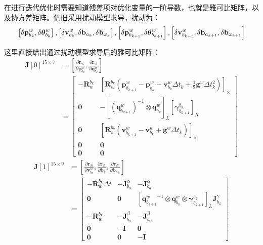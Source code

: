 在进行迭代优化时需要知道残差项对优化变量的一阶导数，也就是雅可比矩阵，以及协方差矩阵。仍旧采用扰动模型求导，扰动为：
\[
\setlength{\abovedisplayskip}{6pt}
\setlength{\belowdisplayskip}{6pt}
\left[\delta \mathbf{p}_{b_{k}}^{w},   \delta \bm{\theta}_{b_{k}}^{w}\right], 
\left[\delta \mathbf{v}_{b_{k}}^{w},   \delta \mathbf{b}_{a_{k}}, \delta \mathbf{b}_{\omega_{k}}\right], 
\left[\delta \mathbf{p}_{b_{k+1}}^{w}, \delta \bm{\theta}_{b_{k+1}}^{w}\right],
\left[\delta \mathbf{v}_{b_{k+1}}^{w}, \delta \mathbf{b}_{a_{k+1}}, \delta \mathbf{b}_{\omega_{k+1}}\right]
\]

这里直接给出通过扰动模型求导后的雅可比矩阵：
\begin{equation}
\label{eqn:4.10}
\begin{aligned}
\mathbf{J}[0]^{15 \times 7} &= \left[\frac{\partial \mathbf{r}_{\mathcal{B}}}{\partial \mathbf{p}_{b_{k}}^{w}}, \frac{\partial \mathbf{r}_{\mathcal{B}}}{\partial \mathbf{q}_{b_{k}}^{w}}\right] \\
&= \left[\begin{array}{cc}
-\mathbf{R}_{w}^{b_{k}} & \left[ \mathbf{R}_{w}^{b_{k}}\left(\mathbf{p}_{b_{k+1}}^{w} - \mathbf{p}_{b_{k}}^{w} - \mathbf{v}_{b_{k}}^{w} \Delta t_{k}+\frac{1}{2} \mathbf{g}^{w} \Delta t_{k}^{2}\right) \right]_\times \\ 
\bm{0}                       & -{\left[ (\mathbf{q}_{b_{k+1}}^{w})^{-1} \otimes \mathbf{q}_{b_{k}}^{w}\right]}_L {\left[\bm{\gamma}_{b_{k+1}}^{b_{k}}\right]}_R \\
\bm{0}                       & \left[ \mathbf{R}_{w}^{b_{k}}\left(\mathbf{v}_{b_{k+1}}^{w} - \mathbf{v}_{b_{k}}^{w} + \mathbf{g}^{w} \Delta t_{k}\right) \right]_\times \\
\bm{0}                       &\bm{0}\\
\bm{0}                      & \bm{0}
\end{array}\right]
\end{aligned}
\end{equation}
\begin{equation}
\label{eqn:4.11}
\begin{aligned}
\mathbf{J}[1]^{15 \times 9} &= \left[\frac{\partial \mathbf{r}_{\mathcal{B}}}{\partial \mathbf{v}_{b_{k}}^{w}}, \frac{\partial \mathbf{r}_{\mathcal{B}}}{\partial \mathbf{b}_{k}}, \frac{\partial \mathbf{r}_{\mathcal{B}}}{\partial \mathbf{b}_{w_{k}}}\right] \\
&= \left[ \begin{array}{ccc}
{-\mathbf{R}_{w}^{b_{k}} \Delta t} & {-\mathbf{J}_{b_{a}}^{\alpha}} & {-\mathbf{J}_{b_{\omega}}^{\alpha}} \\ 
{\bm{0}} & {\bm{0}} & {\left[{\mathbf{q}_{b_{k+1}}^{w}}^{-1} \otimes \mathbf{q}_{b_{k}}^{w} \otimes \bm{\gamma}_{b_{k+1}}^{b_{k}}\right]_L \mathbf{J}_{b_{\omega}}^{\gamma}} \\ 
{-\mathbf{R}_{w}^{b_{k}}} & {-\mathbf{J}_{b_{a}}^{\beta}} & {-\mathbf{J}_{b_{\omega}}^{\beta}} \\ 
{\bm{0}} & {-\mathbf{I}} & {\bm{0}} \\ {\bm{0}} & {\bm{0}} & {\mathbf{-I}}\end{array}\right]
\end{aligned}
\end{equation}
